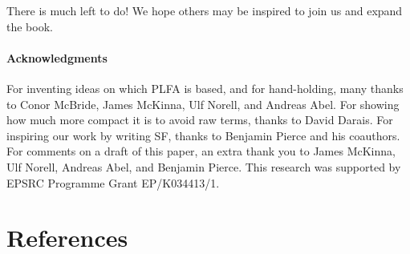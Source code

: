 \documentclass[preprint,authoryear]{elsarticle}
\begin{document}
There is much left to do!  We hope others may be inspired to join us
and expand the book.

\paragraph{Acknowledgments}

For inventing ideas on which PLFA is based, and for hand-holding, many thanks to
Conor McBride, James McKinna, Ulf Norell, and Andreas Abel.  For showing how
much more compact it is to avoid raw terms, thanks to David Darais.  For
inspiring our work by writing SF, thanks to Benjamin Pierce and his coauthors.
For comments on a draft of this paper, an extra thank you to James McKinna, Ulf
Norell, Andreas Abel, and Benjamin Pierce. This research was supported by EPSRC
Programme Grant EP/K034413/1.


\section*{References}



\end{document}
